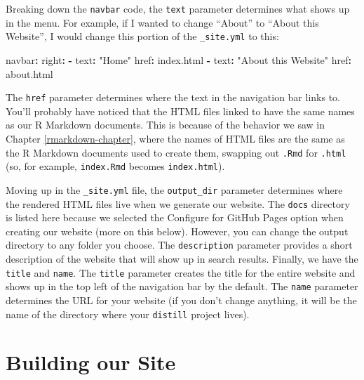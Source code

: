 \documentclass[
]{book}
\newenvironment{Shaded}{\begin{snugshade}}{\end{snugshade}}
\newcommand{\AttributeTok}[1]{\textcolor[rgb]{0.77,0.63,0.00}{#1}}
\newcommand{\FunctionTok}[1]{\textcolor[rgb]{0.00,0.00,0.00}{#1}}
\newcommand{\KeywordTok}[1]{\textcolor[rgb]{0.13,0.29,0.53}{\textbf{#1}}}
\newcommand{\StringTok}[1]{\textcolor[rgb]{0.31,0.60,0.02}{#1}}
\begin{document}
Breaking down the \texttt{navbar} code, the \texttt{text} parameter determines what shows up in the menu. For example, if I wanted to change ``About'' to ``About this Website'', I would change this portion of the \texttt{\_site.yml} to this:

\begin{Shaded}
\begin{Highlighting}[]
\FunctionTok{navbar}\KeywordTok{:}
\AttributeTok{  }\FunctionTok{right}\KeywordTok{:}
\AttributeTok{    }\KeywordTok{{-}}\AttributeTok{ }\FunctionTok{text}\KeywordTok{:}\AttributeTok{ }\StringTok{"Home"}
\AttributeTok{      }\FunctionTok{href}\KeywordTok{:}\AttributeTok{ index.html}
\AttributeTok{    }\KeywordTok{{-}}\AttributeTok{ }\FunctionTok{text}\KeywordTok{:}\AttributeTok{ }\StringTok{"About this Website"}
\AttributeTok{      }\FunctionTok{href}\KeywordTok{:}\AttributeTok{ about.html}
\end{Highlighting}
\end{Shaded}

The \texttt{href} parameter determines where the text in the navigation bar links to. You'll probably have noticed that the HTML files linked to have the same names as our R Markdown documents. This is because of the behavior we saw in Chapter \ref{rmarkdown-chapter}, where the names of HTML files are the same as the R Markdown documents used to create them, swapping out \texttt{.Rmd} for \texttt{.html} (so, for example, \texttt{index.Rmd} becomes \texttt{index.html}).

Moving up in the \texttt{\_site.yml} file, the \texttt{output\_dir} parameter determines where the rendered HTML files live when we generate our website. The \texttt{docs} directory is listed here because we selected the Configure for GitHub Pages option when creating our website (more on this below). However, you can change the output directory to any folder you choose. The \texttt{description} parameter provides a short description of the website that will show up in search results. Finally, we have the \texttt{title} and \texttt{name}. The \texttt{title} parameter creates the title for the entire website and shows up in the top left of the navigation bar by the default. The \texttt{name} parameter determines the URL for your website (if you don't change anything, it will be the name of the directory where your \texttt{distill} project lives).

\hypertarget{building-our-site}{%
\section*{Building our Site}\label{building-our-site}}
\end{document}
